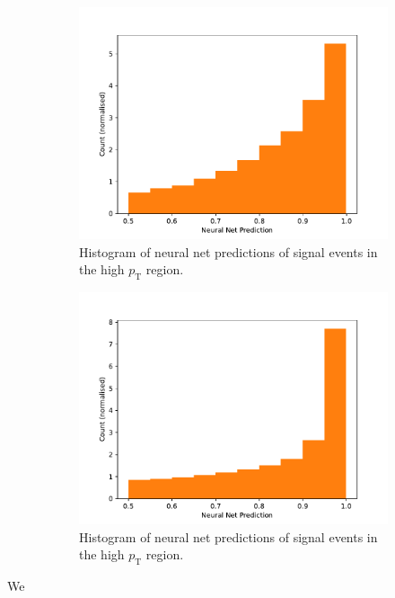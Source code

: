 \documentclass[11pt]{article}
\numberwithin{equation}{section}
\numberwithin{figure}{section}
\numberwithin{table}{section}
\begin{document}
\begin{figure}[h]%
    \centering
    \begin{subfigure}[t]{.49\linewidth}
        \centering
        \includegraphics[width=\linewidth]{Plots/sig_high_pt.pdf}
        \caption{Histogram of neural net predictions of signal events in the high $p_\mathrm{T}$ region.}
        \label{fig:sig_high_pt}
    \end{subfigure}
    \hfill
    \begin{subfigure}[t]{.49\linewidth}
        \centering
        \includegraphics[width=\linewidth]{Plots/sig_low_pt.pdf}
        \caption{Histogram of neural net predictions of signal events in the high $p_\mathrm{T}$ region.}
        \label{fig:sig_low_pt}
    \end{subfigure}
\caption{}
\label{}
\end{figure}

We 

\newpage
\printbibliography
\end{document}
